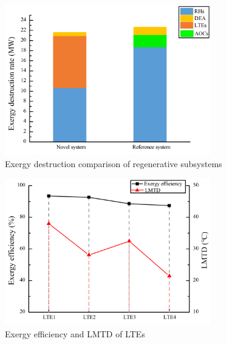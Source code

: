 \documentclass[preprint,12pt]{elsarticle}
\begin{document}
\begin{figure}[htbp]
\centering
\includegraphics[width=0.8\textwidth]{fig/regenerative_subsys_compare.png}
\caption{Exergy destruction comparison of regenerative subsystems} 
\label{fig:regenerative_subsys_compare}
\end{figure}



\begin{figure}[htbp]
\centering
\includegraphics[width=0.8\textwidth]{fig/LPE_exergy_LMTD.png}
\caption{Exergy efficiency and LMTD of LTEs} 
\label{fig:LPE_exergy_LMDT}
\end{figure}
\end{document}
